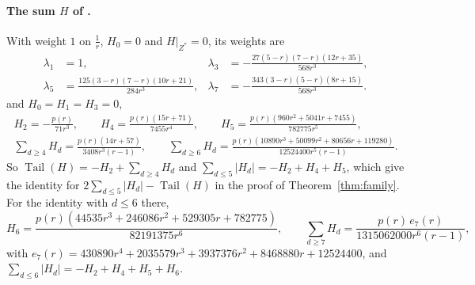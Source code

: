 \documentclass[11pt]{article}
\DeclareMathOperator{\Tail}{Tail}
\begin{document}
\paragraph{The sum $H$ of \cite[Theorem~5.3]{coefficient-mass-attainment}.}  With weight $1$ on
$\tfrac1r$, $H_0=0$ and $H|_{Z^*}=0$, its weights are
\[
  \begin{aligned}
  \lambda_1&=1,&
  \lambda_3&=-\frac{27(5-r)(7-r)(12r+35)}{568r^3},\\
  \lambda_5&=\frac{125(3-r)(7-r)(10r+21)}{284r^3},&
  \lambda_7&=-\frac{343(3-r)(5-r)(8r+15)}{568r^3}.
  \end{aligned}
\]
and $H_0=H_1=H_3=0$,
\begin{gather*}
  H_2=-\frac{p(r)}{71r^3},\qquad
  H_4=\frac{p(r)(15r+71)}{7455r^4},\qquad
  H_5=\frac{p(r)(960r^2+5041r+7455)}{782775r^5},\\
  \sum_{d\ge4}H_d=\frac{p(r)(14r+57)}{3408r^3(r-1)},\qquad
  \sum_{d\ge6}H_d=\frac{p(r)(10890r^3+50099r^2+80656r+119280)}{12524400r^5(r-1)} .
\end{gather*}
So $\Tail(H)=-H_2+\sum_{d\ge4}H_d$ and $\sum_{d\le5}|H_d|=-H_2+H_4+H_5$,
which give the identity for $2\sum_{d\le5}|H_d|-\Tail(H)$ in the proof of
Theorem~\ref{thm:family}.  For the identity with $d\le6$ there,
\[
  H_6=\frac{p(r)(44535r^3+246086r^2+529305r+782775)}{82191375r^6},\qquad
  \sum_{d\ge7}H_d=\frac{p(r)\,e_7(r)}{1315062000r^6(r-1)},
\]
with $e_7(r)=430890r^4+2035579r^3+3937376r^2+8468880r+12524400$, and
$\sum_{d\le6}|H_d|=-H_2+H_4+H_5+H_6$.
\end{document}
